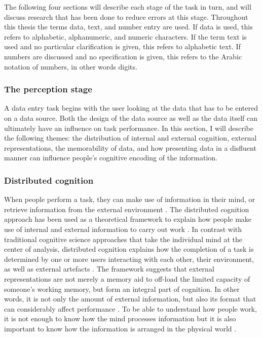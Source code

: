 The following four sections will describe each stage of the task in turn, and will discuss research that has been done to reduce errors at this stage. 
Throughout this thesis the terms data, text, and number entry are used. If data is used, this refers to alphabetic, alphanumeric, and numeric characters. 
If the term text is used and no particular clarification is given, this refers to alphabetic text. If numbers are discussed and no specification is given, this refers to the Arabic notation of numbers, in other words digits. 

\subsubsection{The perception stage}
A data entry task begins with the user looking at the data that has to be entered on a data source.
Both the design of the data source as well as the data itself can ultimately have an influence on task performance. In this section, I will describe the following themes: the distribution of internal and external cognition, external representations, the memorability of data, and how presenting data in a disfluent manner can influence people's cognitive encoding of the information.

\subsubsection{Distributed cognition}
When people perform a task, they can make use of information in their mind, or retrieve information from the external environment \citep{Norman1993}.
The distributed cognition approach has been used as a theoretical framework to explain how people make use of internal and external information to carry out work \citep{Hollan2000}. In contrast with traditional cognitive science approaches that take the individual mind at the center of analysis, distributed cognition explains how the completion of a task is determined by one or more users interacting with each other, their environment, as well as external artefacts \citep{Hutchins1995}. The framework suggests that external representations are not merely a memory aid to off-load the limited capacity of someone's working memory, but form an integral part of cognition. In other words, it is not only the amount of external information, but also its format that can considerably affect performance \citep{Gong2009, Zhang2009}.
To be able to understand how people work, it is not enough to know how the mind processes information but it is also important to know how the information is arranged in the physical world \citep{Hollan2000}. 

